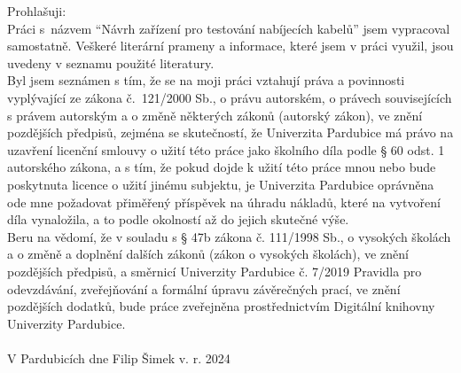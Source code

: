 
Prohlašuji:
\\
Práci s názvem “Návrh zařízení pro testování nabíjecích kabelů” jsem vypracoval samostatně. Veškeré literární prameny a informace, které jsem v práci využil, jsou uvedeny v seznamu použité literatury.
\\
Byl jsem seznámen s tím, že se na moji práci vztahují práva a povinnosti vyplývající ze zákona č. 121/2000 Sb., o právu autorském, o právech souvisejících s právem autorským a o změně některých zákonů (autorský zákon), ve znění pozdějších předpisů, zejména se skutečností, že Univerzita Pardubice má právo na uzavření licenční smlouvy o užití této práce jako školního díla podle § 60 odst. 1 autorského zákona, a s tím, že pokud dojde k užití této práce mnou nebo bude poskytnuta licence o užití jinému subjektu, je Univerzita Pardubice oprávněna ode mne požadovat přiměřený příspěvek na úhradu nákladů, které na vytvoření díla vynaložila, a to podle okolností až do jejich skutečné výše.
\\
Beru na vědomí, že v souladu s § 47b zákona č. 111/1998 Sb., o vysokých školách a o změně a doplnění dalších zákonů (zákon o vysokých školách), ve znění pozdějších předpisů, a směrnicí Univerzity Pardubice č. 7/2019 Pravidla pro odevzdávání, zveřejňování a formální úpravu závěrečných prací, ve znění pozdějších dodatků, bude práce zveřejněna prostřednictvím Digitální knihovny Univerzity Pardubice.\\\\
V Pardubicích dne \hfill Filip Šimek v. r. 2024